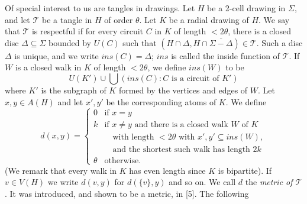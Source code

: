 Of special interest to us are tangles in drawings. Let $H$ be a 2-cell drawing in $\Sigma$, and let $\mathscr{T}$ be a tangle in $H$ of order $\theta$. Let $K$ be a radial drawing of $H$. We say that $\mathscr{T}$ is respectful if for every circuit $C$ in $K$ of length $<2\theta$, there is a closed disc $\Delta \subseteq \Sigma$ bounded by $U(C)$ such that $(H \cap \Delta, H \cap \overline{\Sigma - \Delta}) \in \mathscr{T}$. Such a disc $\Delta$ is unique, and we write $ins(C) = \Delta$; $ins$ is called the inside function of $\mathscr{T}$. If $W$ is a closed walk in $K$ of length $<2\theta$, we define $ins(W)$ to be
\begin{equation*}
U(K') \cup \bigcup (ins(C) \colon C \text{ is a circuit of } K')
\end{equation*}
where $K'$ is the subgraph of $K$ formed by the vertices and edges of $W$. Let $x, y \in A(H)$ and let $x', y'$ be the corresponding atoms of $K$. We define
\begin{equation*}
d(x, y) = \begin{cases} 0 & \text{if } x = y \\ k & \text{if } x \ne y \text{ and there is a closed walk } W \text{ of } K \\ & \quad \text{with length } < 2\theta \text{ with } x', y' \subseteq ins(W), \\ & \quad \text{and the shortest such walk has length } 2k \\ \theta & \text{otherwise.} \end{cases}
\end{equation*}
(We remark that every walk in $K$ has even length since $K$ is bipartite). If $v \in V(H)$ we write $d(v, y)$ for $d(\{v\}, y)$ and so on. We call $d$ the \textit{metric of $\mathscr{T}$}. It was introduced, and shown to be a metric, in [5]. The following

